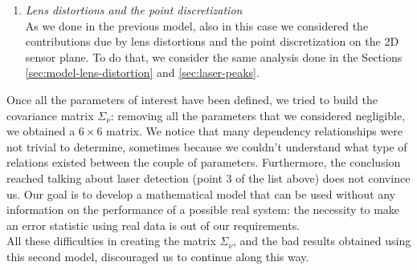 \begin{enumerate}
    \item \textit{Lens distortions and the point discretization} \\
    As we done in the previous model, also in this case we considered the contributions due by lens distortions and the point discretization on the 2D sensor plane. To do that, we consider the same analysis done in the Sections \ref{sec:model-lens-distortion} and \ref{sec:laser-peaks}.
  \end{enumerate}

Once all the parameters of interest have been defined, we tried to build the covariance matrix $\Sigma_\nu$: removing all the parameters that we considered negligible, we obtained a $6\times6$ matrix. We notice that many dependency relationships were not trivial to determine, sometimes because we couldn't understand what type of relations existed between the couple of parameters. Furthermore, the conclusion reached talking about laser detection (point 3 of the list above) does not convince us. Our goal is to develop a mathematical model that can be used without any information on the performance of a possible real system: the necessity to make an error statistic using real data is out of our requirements. \\
All these difficulties in creating the matrix $\Sigma_\nu$, and the bad results obtained using this second model, discouraged us to continue along this way.
